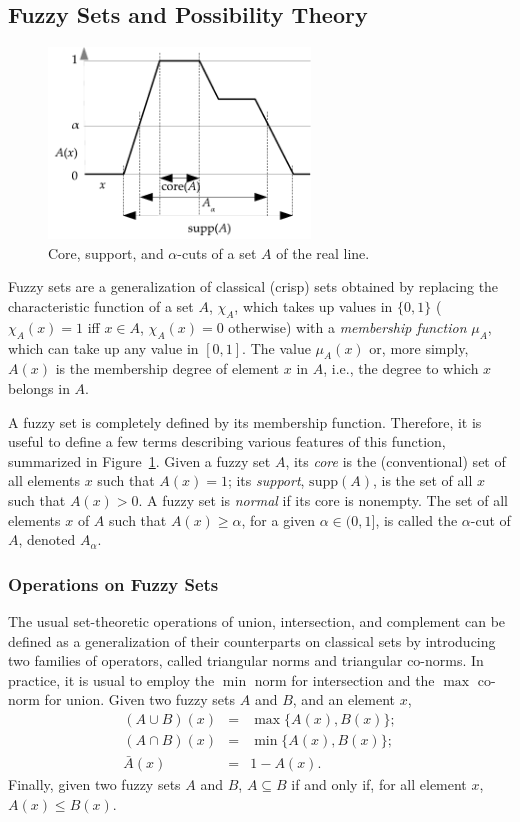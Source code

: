 \documentclass[a4paper]{article}
\newcommand{\Sup}{\mathrm{supp}} %
\begin{document}
\subsection{Fuzzy Sets and Possibility Theory}

\begin{figure}
  \begin{center}
    \includegraphics[height=2in]{fuzzyset}
  \end{center}
  \caption{Core, support, and $\alpha$-cuts of a set $A$ of the
    real line.\label{fig:alphacuts}}
\end{figure}

Fuzzy sets \cite{Zadeh1965} are a generalization of classical (crisp) sets obtained by
replacing the characteristic function of a set $A$, $\chi_A$,
which takes up values in $\{0, 1\}$ ($\chi_A(x) = 1$ iff $x \in A$,
$\chi_A(x) = 0$ otherwise) with a \emph{membership function}
$\mu_A$, which can take up any value in $[0, 1]$. The value
$\mu_A(x)$ or, more simply, $A(x)$ is the membership degree of element $x$ in $A$, i.e.,
the degree to which $x$ belongs in $A$.

A fuzzy set is completely defined by its membership
function. Therefore, it is useful to define a few terms describing
various features of this function, summarized in Figure~\ref{fig:alphacuts}.
Given a fuzzy set $A$, its \emph{core} is the (conventional) set
of all elements $x$ such that $A(x) = 1$; its \emph{support}, $\Sup(A)$,
is the set of all $x$ such that $A(x) > 0$.
A fuzzy set is \emph{normal} if its core is nonempty.
The set of all elements $x$ of $A$ such that $A(x)\geq\alpha$,
for a given $\alpha\in(0, 1]$, is called the $\alpha$-cut of $A$,
denoted $A_{\alpha}$.

\subsubsection{Operations on Fuzzy Sets}

The usual set-theoretic operations of union, intersection, and complement
can be defined as a generalization of their counterparts on classical
sets by introducing two families of operators, called triangular norms
and triangular co-norms.
In practice, it is usual to employ the $\min$ norm
for intersection and the $\max$ co-norm for union.
Given two fuzzy sets $A$ and $B$, and an element $x$,
\begin{eqnarray}
 (A \cup B)(x) &=& \max\{A(x), B(x)\}; \\
 (A \cap B)(x) &=& \min\{A(x), B(x)\}; \\
 \bar A(x) &=& 1 - A(x).
\end{eqnarray}
Finally, given two fuzzy sets $A$ and $B$,
$A \subseteq B$ if and only if, for all element $x$,
$A(x) \leq B(x)$.
\end{document}
